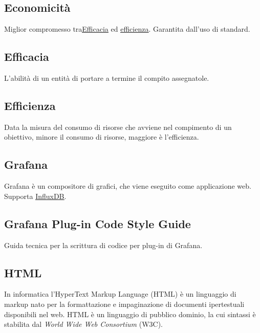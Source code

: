 	\subsection{Economicità}
	\label{sec:economicita}
	Miglior compromesso tra\underline{\hyperref[sec:efficacia]{Efficacia}} ed \underline{\hyperref[sec:efficienza]{efficienza}}. Garantita dall'uso di standard.

	\subsection{Efficacia}
	\label{sec:efficacia}
	L'abilità di un entità di portare a termine il compito assegnatole.


	\subsection{Efficienza}
	\label{sec:efficienza}
	Data la misura del consumo di risorse che avviene nel compimento di un obiettivo, minore il consumo di risorse, maggiore è l'efficienza.
	
	
	\newpage
	
	\subsection{Grafana}
	\label{sec:grafana}
	Grafana è un compositore di grafici, che viene eseguito come applicazione web. Supporta \underline{\hyperref[sec:influxdb]{InfluxDB}}.


	\subsection{Grafana Plug-in Code Style Guide}
	\label{sec:grafana}
	Guida tecnica per la scrittura di codice per plug-in di Grafana.	
	

	\newpage 


	\subsection{HTML}
	\label{sec:html}
	In informatica l'HyperText Markup Language (HTML) è un linguaggio di markup  nato per la formattazione e impaginazione di documenti ipertestuali disponibili nel web. HTML è un linguaggio di pubblico dominio, la cui sintassi è stabilita dal \emph{World Wide Web Consortium} (W3C).
	

